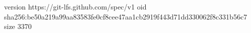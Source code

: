 version https://git-lfs.github.com/spec/v1
oid sha256:be50a219a99aa83583fe0cf8cee47aa1cb2919f443d71dd330062f8c331b56c7
size 3370
